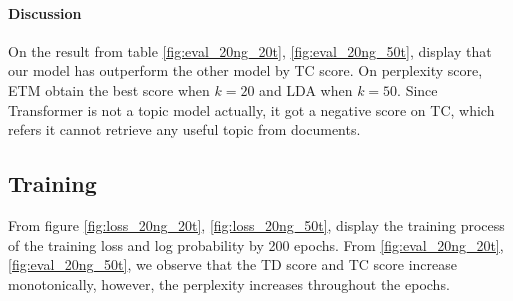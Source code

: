 \paragraph{Discussion}On the result from table \ref{fig:eval_20ng_20t}, \ref{fig:eval_20ng_50t}, display that our model has outperform the other model by TC score. On perplexity score, ETM obtain the best score when $ k=20 $ and LDA when $ k=50 $. Since Transformer is not a topic model actually, it got a negative score on TC, which refers it cannot retrieve any useful topic from documents.
\subsection{Training}
From figure \ref{fig:loss_20ng_20t}, \ref{fig:loss_20ng_50t}, display the training process of the training loss and log probability by 200 epochs. From \ref{fig:eval_20ng_20t}, \ref{fig:eval_20ng_50t}, we observe that the TD score and TC score increase monotonically, however, the perplexity increases throughout the epochs. 
